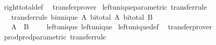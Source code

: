 \begin{isabellebody}
%
\isadelimproof
%
\endisadelimproof
%
\isatagproof
{}\isamarkupfalse%
\ right{\isacharunderscore}{\kern0pt}total{\isacharunderscore}{\kern0pt}def\ \isamarkupfalse%
\ transfer{\isacharunderscore}{\kern0pt}prover%
\endisatagproof
{\isafoldproof}%
%
\isadelimproof
\isanewline
%
\endisadelimproof
\isanewline
{}\isamarkupfalse%
\ left{\isacharunderscore}{\kern0pt}unique{\isacharunderscore}{\kern0pt}parametric\ {\isacharbrackleft}{\kern0pt}transfer{\isacharunderscore}{\kern0pt}rule{\isacharbrackright}{\kern0pt}{\isacharcolon}{\kern0pt}\isanewline
\ \ \ {\isacharbrackleft}{\kern0pt}transfer{\isacharunderscore}{\kern0pt}rule{\isacharbrackright}{\kern0pt}{\isacharcolon}{\kern0pt}\ {\isachardoublequoteopen}bi{\isacharunderscore}{\kern0pt}unique\ A{\isachardoublequoteclose}\ {\isachardoublequoteopen}bi{\isacharunderscore}{\kern0pt}total\ A{\isachardoublequoteclose}\ {\isachardoublequoteopen}bi{\isacharunderscore}{\kern0pt}total\ B{\isachardoublequoteclose}\isanewline
\ \ \ {\isachardoublequoteopen}{\isacharparenleft}{\kern0pt}{\isacharparenleft}{\kern0pt}A\ {\isacharequal}{\kern0pt}{\isacharequal}{\kern0pt}{\isacharequal}{\kern0pt}{\isachargreater}{\kern0pt}\ B\ {\isacharequal}{\kern0pt}{\isacharequal}{\kern0pt}{\isacharequal}{\kern0pt}{\isachargreater}{\kern0pt}\ {\isacharparenleft}{\kern0pt}{\isacharequal}{\kern0pt}{\isacharparenright}{\kern0pt}{\isacharparenright}{\kern0pt}\ {\isacharequal}{\kern0pt}{\isacharequal}{\kern0pt}{\isacharequal}{\kern0pt}{\isachargreater}{\kern0pt}\ {\isacharparenleft}{\kern0pt}{\isacharequal}{\kern0pt}{\isacharparenright}{\kern0pt}{\isacharparenright}{\kern0pt}\ left{\isacharunderscore}{\kern0pt}unique\ left{\isacharunderscore}{\kern0pt}unique{\isachardoublequoteclose}\isanewline
%
\isadelimproof
%
\endisadelimproof
%
\isatagproof
{}\isamarkupfalse%
\ left{\isacharunderscore}{\kern0pt}unique{\isacharunderscore}{\kern0pt}def\ \isamarkupfalse%
\ transfer{\isacharunderscore}{\kern0pt}prover%
\endisatagproof
{\isafoldproof}%
%
\isadelimproof
\isanewline
%
\endisadelimproof
\isanewline
{}\isamarkupfalse%
\ prod{\isacharunderscore}{\kern0pt}pred{\isacharunderscore}{\kern0pt}parametric\ {\isacharbrackleft}{\kern0pt}transfer{\isacharunderscore}{\kern0pt}rule{\isacharbrackright}{\kern0pt}{\isacharcolon}{\kern0pt}\isanewline

\end{isabellebody}
